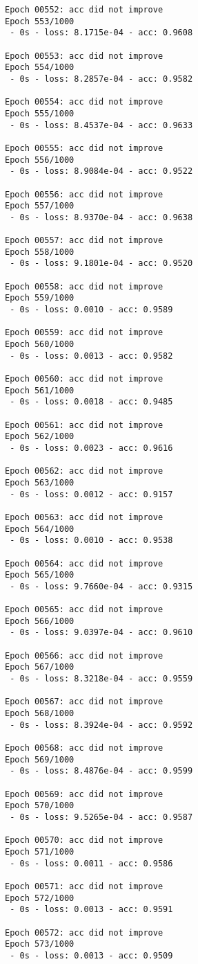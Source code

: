 \documentclass[11pt]{article}
\begin{document}
\begin{Verbatim}[commandchars=\\\{\}]
Epoch 00552: acc did not improve
Epoch 553/1000
 - 0s - loss: 8.1715e-04 - acc: 0.9608

Epoch 00553: acc did not improve
Epoch 554/1000
 - 0s - loss: 8.2857e-04 - acc: 0.9582

Epoch 00554: acc did not improve
Epoch 555/1000
 - 0s - loss: 8.4537e-04 - acc: 0.9633

Epoch 00555: acc did not improve
Epoch 556/1000
 - 0s - loss: 8.9084e-04 - acc: 0.9522

Epoch 00556: acc did not improve
Epoch 557/1000
 - 0s - loss: 8.9370e-04 - acc: 0.9638

Epoch 00557: acc did not improve
Epoch 558/1000
 - 0s - loss: 9.1801e-04 - acc: 0.9520

Epoch 00558: acc did not improve
Epoch 559/1000
 - 0s - loss: 0.0010 - acc: 0.9589

Epoch 00559: acc did not improve
Epoch 560/1000
 - 0s - loss: 0.0013 - acc: 0.9582

Epoch 00560: acc did not improve
Epoch 561/1000
 - 0s - loss: 0.0018 - acc: 0.9485

Epoch 00561: acc did not improve
Epoch 562/1000
 - 0s - loss: 0.0023 - acc: 0.9616

Epoch 00562: acc did not improve
Epoch 563/1000
 - 0s - loss: 0.0012 - acc: 0.9157

Epoch 00563: acc did not improve
Epoch 564/1000
 - 0s - loss: 0.0010 - acc: 0.9538

Epoch 00564: acc did not improve
Epoch 565/1000
 - 0s - loss: 9.7660e-04 - acc: 0.9315

Epoch 00565: acc did not improve
Epoch 566/1000
 - 0s - loss: 9.0397e-04 - acc: 0.9610

Epoch 00566: acc did not improve
Epoch 567/1000
 - 0s - loss: 8.3218e-04 - acc: 0.9559

Epoch 00567: acc did not improve
Epoch 568/1000
 - 0s - loss: 8.3924e-04 - acc: 0.9592

Epoch 00568: acc did not improve
Epoch 569/1000
 - 0s - loss: 8.4876e-04 - acc: 0.9599

Epoch 00569: acc did not improve
Epoch 570/1000
 - 0s - loss: 9.5265e-04 - acc: 0.9587

Epoch 00570: acc did not improve
Epoch 571/1000
 - 0s - loss: 0.0011 - acc: 0.9586

Epoch 00571: acc did not improve
Epoch 572/1000
 - 0s - loss: 0.0013 - acc: 0.9591

Epoch 00572: acc did not improve
Epoch 573/1000
 - 0s - loss: 0.0013 - acc: 0.9509


\end{Verbatim}
\end{document}
